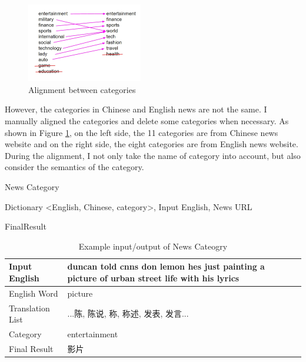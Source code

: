\begin{figure}[ht]
    \centering
    \includegraphics[width=0.45\textwidth]{wsd_4.jpg}
    \caption{Alignment between categories}
    \label{fig:wsd_4}
\end{figure}

However, the categories in Chinese and English news are not the same.
I manually aligned the categories and delete some categories when necessary.
As shown in Figure \ref{fig:wsd_4}, 
on the left side, the 11 categories are from Chinese news website and on the right side, the eight categories are from English news website. 
During the alignment, I not only take the name of category into account, but also consider the semantics of the category.
\\
\begin{algorithm}[ht]
\caption{News Category}
\label{algorithm:wsd_2}
\begin{algorithmic}
\REQUIRE Dictionary \textless English, Chinese, category\textgreater, Input English, News URL

        \ENDIF
    \ENDFOR
\ENDIF
\RETURN FinalResult

\end{algorithmic}
\end{algorithm}
\begin{table}[ht]
    \caption{Example input/output of News Cateogry}
    \begin{center}
    \begin{tabular}{| p{2.5cm} | p{4cm} |}
        \hline
        Input English & duncan told cnns don lemon hes just painting a picture of urban street life with his lyrics\\
        \hline
        English Word & picture \\
        \hline
        Translation List & \parbox[t]{4cm}{...陈, 陈说, 称, 称述, 发表, 发言...}\\
        \hline        
        Category & entertainment\\
        \hline
        Final Result & 影片\\
        \hline
    \end{tabular}
    \end{center}
\end{table}

